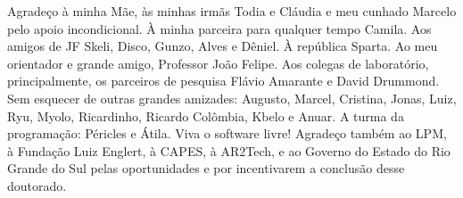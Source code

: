 \documentclass[
    oneside, %
	12pt,				%
	a4paper,			%
	chapter=TITLE,		%
	english,			%
	french,				%
	spanish,			%
	brazil				%
	]{dissertacao-ufrgs-abntex2}
\begin{document}
\frenchspacing 


\imprimircapa

\imprimirfolhaderosto*


%
%     


%
% 
%

\begin{agradecimentos}

Agradeço à minha Mãe, às minhas irmãs Todia e Cláudia e meu cunhado Marcelo pelo apoio incondicional. À minha parceira para qualquer tempo Camila. Aos amigos de JF Skeli, Disco, Gunzo, Alves e Dêniel. À república Sparta. Ao meu orientador e grande amigo, Professor João Felipe. Aos colegas de laboratório, principalmente, os parceiros de pesquisa Flávio Amarante e David Drummond. Sem esquecer de outras grandes amizades: Augusto, Marcel, Cristina, Jonas, Luiz, Ryu, Myolo, Ricardinho, Ricardo Colômbia, Kbelo e Anuar. A turma  da programação: Péricles e Átila. Viva o software livre! Agradeço também ao LPM, à Fundação Luiz Englert, à CAPES, à AR2Tech, e ao Governo do Estado do Rio Grande do Sul pelas oportunidades e por incentivarem a conclusão desse doutorado.

\end{agradecimentos}
\end{document}

